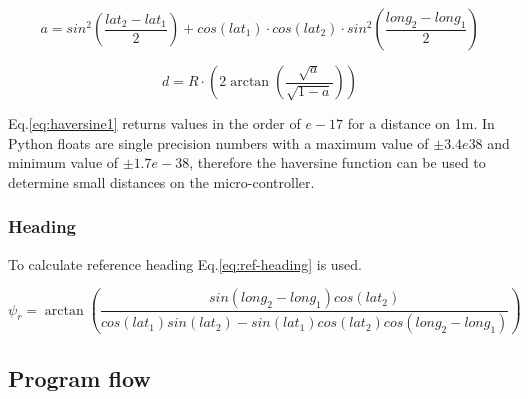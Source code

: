 \begin{equation}
    \label{eq:haversine1}
    a = sin^{2}\left( \frac{lat_{2} - lat_{1}}{2}\right) + cos(lat_{1})\cdot cos(lat_{2})\cdot sin^2\left(\frac{long_{2} - long_{1}}{2}\right)
\end{equation}

\begin{equation}
    \label{eq:haversine2}
    d = R\cdot \left(2\arctan\left(\frac{\sqrt{a}}{\sqrt{1-a}}\right)\right)
\end{equation}


Eq.\ref{eq:haversine1} returns values in the order of $e-17$ for a 
distance on 1m. In Python floats are single precision numbers with a maximum value of $\pm3.4e38$ and minimum value of $\pm1.7e-38$, therefore the haversine function can be used to determine 
small distances on the micro-controller. 

\subsubsection{Heading}
To calculate reference heading Eq.\ref{eq:ref-heading} is used.

\begin{equation}
    \label{eq:ref-heading}
    \psi_{r} = \arctan\left( \frac{sin(long_2 - long_1)cos(lat_2)}{cos(lat_1)sin(lat_2) - sin(lat_1)cos(lat_2)cos(long_2 - long_1)}\right)
\end{equation}


\subsection{Program flow}


